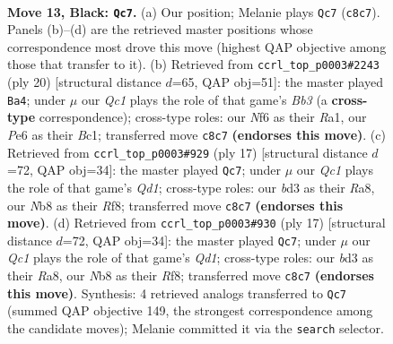 \documentclass[11pt]{article}
\begin{document}
\clearpage

\begin{figure}[p]\centering
\begin{subfigure}{0.46\textwidth}\centering
\resizebox{\linewidth}{!}{%
\newchessgame
\chessboard[
  setfen={rnqbr1k1/pp1b1ppp/4pn2/2Pp4/N2P4/3B1N2/PP1B1PPP/2RQ1RK1 b - - 12 13},
  showmover=false,
  pgfstyle=straightmove, color=movearrow, markmove={c8-c7}
]}
\caption{}
\end{subfigure}\hfill
\begin{subfigure}{0.46\textwidth}\centering
\resizebox{\linewidth}{!}{%
\newchessgame
\chessboard[
  setfen={r1bq1rk1/1pp2ppp/2n2n2/p1b1p3/4P3/1BP2N2/PP1NQPPP/R1B2RK1 w - - 0 11},
  showmover=false,
  pgfstyle=straightmove, color=movearrow, markmove={b3-a4}
]}
\caption{}
\end{subfigure}
\\[4pt]
\begin{subfigure}{0.46\textwidth}\centering
\resizebox{\linewidth}{!}{%
\newchessgame
\chessboard[
  setfen={r1bq1rk1/pp2ppbp/2n2np1/2p3B1/2B1P3/2P2N2/PP1N1PPP/R2Q1RK1 b - - 3 9},
  showmover=false,
  pgfstyle=straightmove, color=movearrow, markmove={d8-c7}
]}
\caption{}
\end{subfigure}\hfill
\begin{subfigure}{0.46\textwidth}\centering
\resizebox{\linewidth}{!}{%
\newchessgame
\chessboard[
  setfen={r1bq1rk1/pp2ppbp/2n2np1/2p3B1/2B1P3/2P2N2/PP1N1PPP/R2Q1RK1 b - - 3 9},
  showmover=false,
  pgfstyle=straightmove, color=movearrow, markmove={d8-c7}
]}
\caption{}
\end{subfigure}
\caption{\textbf{Move 13, Black: \texttt{Qc7}.} (a) Our position; Melanie plays \texttt{Qc7} (\texttt{c8c7}). Panels (b)--(d) are the retrieved master positions whose correspondence most drove this move (highest QAP objective among those that transfer to it). (b) Retrieved from \texttt{ccrl\_top\_p0003\#2243} (ply 20) [structural distance $d$=65, QAP obj=51]: the master played \texttt{Ba4}; under $\mu$ our \emph{Qc1} plays the role of that game's \emph{Bb3} (a \textbf{cross-type} correspondence); cross-type roles: our \emph{N}f6 as their \emph{R}a1, our \emph{P}e6 as their \emph{B}c1; transferred move \texttt{c8c7} \textbf{(endorses this move)}. (c) Retrieved from \texttt{ccrl\_top\_p0003\#929} (ply 17) [structural distance $d$=72, QAP obj=34]: the master played \texttt{Qc7}; under $\mu$ our \emph{Qc1} plays the role of that game's \emph{Qd1}; cross-type roles: our \emph{b}d3 as their \emph{R}a8, our \emph{N}b8 as their \emph{R}f8; transferred move \texttt{c8c7} \textbf{(endorses this move)}. (d) Retrieved from \texttt{ccrl\_top\_p0003\#930} (ply 17) [structural distance $d$=72, QAP obj=34]: the master played \texttt{Qc7}; under $\mu$ our \emph{Qc1} plays the role of that game's \emph{Qd1}; cross-type roles: our \emph{b}d3 as their \emph{R}a8, our \emph{N}b8 as their \emph{R}f8; transferred move \texttt{c8c7} \textbf{(endorses this move)}. Synthesis: 4 retrieved analogs transferred to \texttt{Qc7} (summed QAP objective 149, the strongest correspondence among the candidate moves); Melanie committed it via the \texttt{search} selector.}
\label{fig:thought-m25}
\end{figure}
\end{document}
